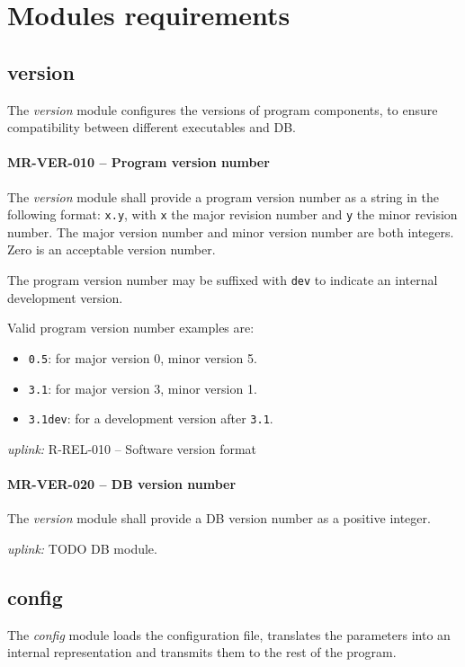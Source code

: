 \section{Modules requirements}
\subsection{version}
The \emph{version} module configures the versions of program components,
to ensure compatibility between different executables and \gls{DB}.

\paragraph{MR-VER-010 -- Program version number}
The \emph{version} module shall provide a program version number
as a string in the following format: \lstinline{x.y},
with \lstinline{x} the major revision number and \lstinline{y} the
minor revision number. The major version number and minor version
number are both integers. Zero is an acceptable version number.

The program version number may be suffixed with \lstinline{dev} to
indicate an internal development version.

Valid program version number examples are:
\begin{itemize}
\item \lstinline{0.5}: for major version 0, minor version 5.
\item \lstinline{3.1}: for major version 3, minor version 1.
\item \lstinline{3.1dev}: for a development version after \lstinline{3.1}.
\end{itemize}

\textit{uplink: } R-REL-010 -- Software version format

\paragraph{MR-VER-020 -- DB version number}
The \emph{version} module shall provide a \gls{DB} version number as
a positive integer.

\textit{uplink: } TODO DB module.

\subsection{config}
The \emph{config} module loads the configuration file, translates the parameters
into an internal representation and transmits them to the rest of the program.

